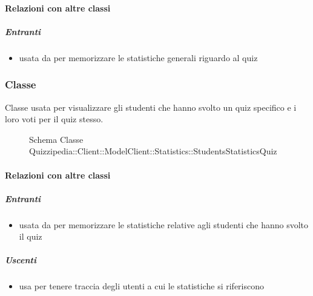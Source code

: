 \paragraph{Relazioni con altre classi}
\subparagraph{Entranti}
\begin{itemize}
\item usata da  per memorizzare le statistiche generali riguardo al quiz
\end{itemize}
\subsubsection{Classe }
Classe usata per visualizzare gli studenti che hanno svolto un quiz specifico e i loro voti per il quiz stesso.
\begin{figure}[H]
\centering
\noindent{}
\caption[Schema Classe StudentsStatisticsQuiz]{Schema Classe Quizzipedia::Client::ModelClient::Statistics::StudentsStatisticsQuiz}
\end{figure}
\paragraph{Relazioni con altre classi}
\subparagraph{Entranti}
\begin{itemize}
\item usata da  per memorizzare le statistiche relative agli studenti che hanno svolto il quiz
\end{itemize}
\subparagraph{Uscenti}
\begin{itemize}
\item usa  per tenere traccia degli utenti a cui le statistiche si riferiscono
\end{itemize}

